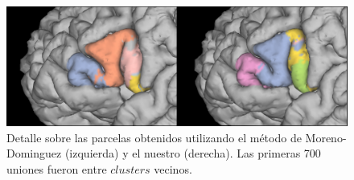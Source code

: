 \begin{figure}[h!]
    \centering
    \includegraphics[width=\textwidth]{img/broca/vs_700.png}
    \caption{Detalle sobre las parcelas obtenidos utilizando 
             el m\'etodo de Moreno-Dominguez (izquierda) y el nuestro
             (derecha). Las primeras 700 uniones fueron entre 
             $clusters$ vecinos.}
    \label{fig:ambos2}
\end{figure}

